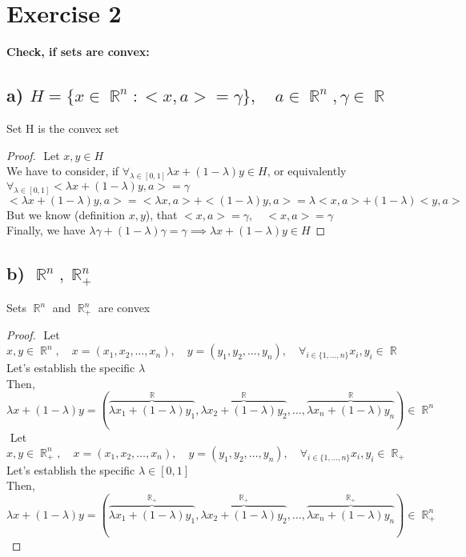 \documentclass[12pt]{article}
\DeclareMathOperator{\R}{\mathbb{R}}
\begin{document}
\section*{Exercise 2}
{\bfseries Check, if sets are convex:}
\subsection*{a) \(H=\{x \in \R^n : <x,a> = \gamma \}, \quad a \in \R^n, \gamma \in \R\) }
Set H is the convex set
\begin{proof}
    $ $\newline
    Let \(x, y \in H\)\\
    We have to consider, if \(\forall_{\lambda \in [0,1]} \lambda x+(1-\lambda)y \in H\), or equivalently \( \forall_{\lambda \in [0,1]} <\lambda x+(1-\lambda)y, a>=\gamma\)\\
    \( <\lambda x+(1-\lambda)y, a>=<\lambda x, a>+<(1-\lambda)y, a>=\lambda<x, a>+(1-\lambda)<y, a> \)\\
    But we know (definition \(x, y\)), that \( <x, a> =\gamma,\quad <x, a> =\gamma\)\\
    Finally, we have \(\lambda\gamma+(1-\lambda)\gamma=\gamma \implies \lambda x+(1-\lambda)y \in H \)
\end{proof}
\subsection*{b) \(\R^n, \R^n_+\)}
Sets \(\R^n\) and \(\R^n_+\) are convex
\begin{proof}
    $ $\newline
    Let \(x, y \in \R^n,\quad x=(x_1, x_2, \ldots, x_n),\quad y=(y_1, y_2, \ldots, y_n), \quad \forall_{i \in \{1, \ldots, n \}}x_i, y_i \in \R\)\\
    Let's establish the specific \(\lambda\)\\
    Then, \( \lambda x+(1-\lambda)y = (\overbrace{\lambda x_1+(1-\lambda)y_1}^{\R},\overbrace{\lambda x_2+(1-\lambda)y_2}^{\R}, \ldots, \overbrace{\lambda x_n+(1-\lambda)y_n}^{\R}) \in \R^n\)\\
    $ $\newline
    Let \(x, y \in \R^n_+,\quad x=(x_1, x_2, \ldots, x_n),\quad y=(y_1, y_2, \ldots, y_n), \quad \forall_{i \in \{1, \ldots, n \}}x_i, y_i \in \R_+\)\\
    Let's establish the specific \(\lambda \in [0,1]\)\\
    Then, \( \lambda x+(1-\lambda)y = (\overbrace{\lambda x_1+(1-\lambda)y_1}^{\R_+},\overbrace{\lambda x_2+(1-\lambda)y_2}^{\R_+}, \ldots, \overbrace{\lambda x_n+(1-\lambda)y_n}^{\R_+}) \in \R^n_+\)\\
\end{proof}
\end{document}
